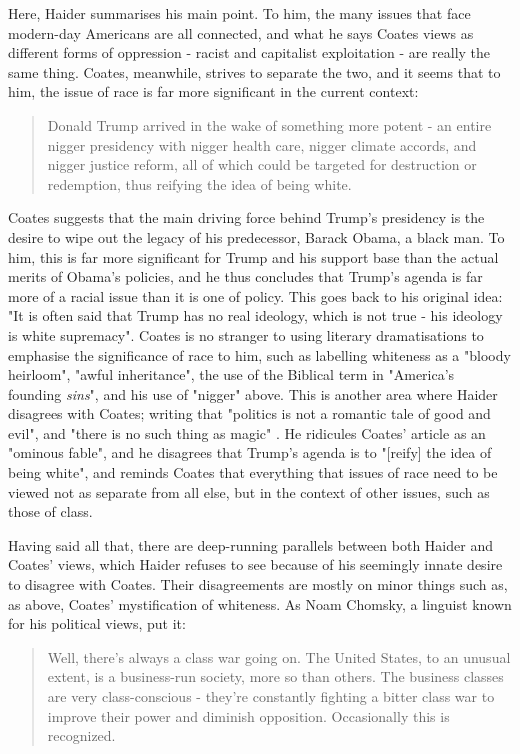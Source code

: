 Here, Haider summarises his main point. To him, the many issues that face modern-day Americans are all connected, and what he says Coates views as different forms of oppression - racist and capitalist exploitation - are really the same thing. Coates, meanwhile, strives to separate the two, and it seems that to him, the issue of race is far more significant in the current context:

\begin{quote}
Donald Trump arrived in the wake of something more potent - an entire nigger presidency with nigger health care, nigger climate accords, and nigger justice reform, all of which could be targeted for destruction or redemption, thus reifying the idea of being white. \cite{coates}
\end{quote}

Coates suggests that the main driving force behind Trump's presidency is the desire to wipe out the legacy of his predecessor, Barack Obama, a black man. To him, this is far more significant for Trump and his support base than the actual merits of Obama's policies, and he thus concludes that Trump's agenda is far more of a racial issue than it is one of policy. This goes back to his original idea: "It is often said that Trump has no real ideology, which is not true - his ideology is white supremacy". Coates is no stranger to using literary dramatisations to emphasise the significance of race to him, such as labelling whiteness as a "bloody heirloom", "awful inheritance", the use of the Biblical term in "America's founding \textit{sins}", and his use of "nigger" above. This is another area where Haider disagrees with Coates; writing that "politics is not a romantic tale of good and evil", and "there is no such thing as magic" \cite{haider}. He ridicules Coates' article as an "ominous fable", and he disagrees that Trump's agenda is to "[reify] the idea of being white", and reminds Coates that everything that issues of race need to be viewed not as separate from all else, but in the context of other issues, such as those of class.

Having said all that, there are deep-running parallels between both Haider and Coates' views, which Haider refuses to see because of his seemingly innate desire to disagree with Coates. Their disagreements are mostly on minor things such as, as above, Coates' mystification of whiteness. As Noam Chomsky, a linguist known for his political views, put it:

\begin{quote}
Well, there's always a class war going on. The United States, to an unusual extent, is a business-run society, more so than others. The business classes are very class-conscious - they're constantly fighting a bitter class war to improve their power and diminish opposition. Occasionally this is recognized. \cite{noam}
\end{quote}

